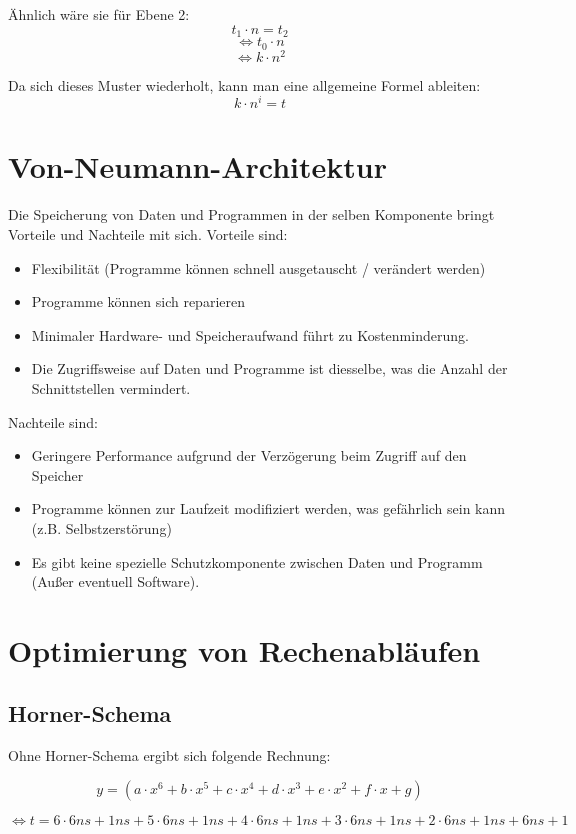 \documentclass{article}
\begin{document}
Ähnlich wäre sie für Ebene 2:
\[t_1 \cdot n = t_2\]
\[\Leftrightarrow t_0 \cdot n\]
\[\Leftrightarrow k \cdot n^2\]

Da sich dieses Muster wiederholt, kann man eine allgemeine Formel ableiten: 
\[k \cdot n^i = t\]

\section{Von-Neumann-Architektur}
Die Speicherung von Daten und Programmen in der selben Komponente bringt Vorteile und Nachteile mit sich. 
Vorteile sind:

\begin{itemize}
	\item Flexibilität (Programme können schnell ausgetauscht / verändert werden)
	\item Programme können sich reparieren
	\item Minimaler Hardware- und Speicheraufwand führt zu Kostenminderung.
	\item Die Zugriffsweise auf Daten und Programme ist diesselbe, was die Anzahl der Schnittstellen vermindert.
\end{itemize}

Nachteile sind:

\begin{itemize}
	\item Geringere Performance aufgrund der Verzögerung beim Zugriff auf den Speicher
	\item Programme können zur Laufzeit modifiziert werden, was gefährlich sein kann (z.B. Selbstzerstörung)
	\item Es gibt keine spezielle Schutzkomponente zwischen Daten und Programm (Außer eventuell Software).
\end{itemize}

\section{Optimierung von Rechenabläufen}
\subsection{Horner-Schema}
	Ohne Horner-Schema ergibt sich folgende Rechnung:

	\[ y = (a \cdot x^6 + b \cdot x^5 + c \cdot x^4 + d \cdot x^3 + e \cdot x^2 + f \cdot x + g) \]

	\[ \Leftrightarrow t = 6 \cdot  6ns + 1ns + 5 \cdot 6ns + 1ns +4 \cdot 6ns +1ns + 3 \cdot 6ns + 1ns + 2 \cdot 6ns +1ns + 6ns +1 \]
\end{document}
